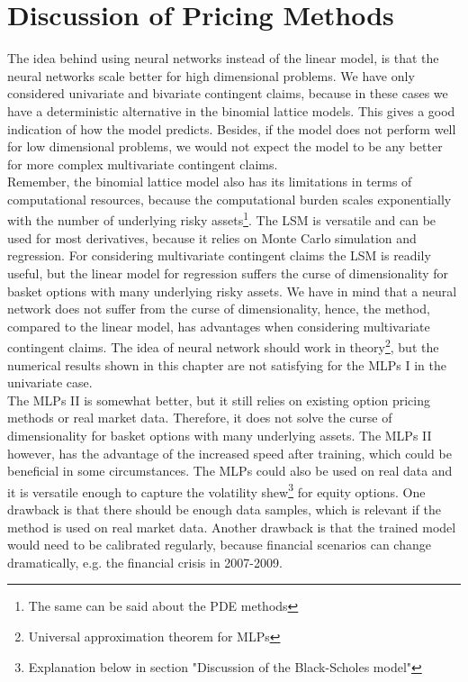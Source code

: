 \section{Discussion of Pricing Methods}
The idea behind using neural networks instead of the linear model, is that the neural networks scale better for high dimensional problems. We have only considered univariate and bivariate contingent claims, because in these cases we have a deterministic alternative in the binomial lattice models. This gives a good indication of how the model predicts. Besides, if the model does not perform well for low dimensional problems, we would not expect the model to be any better for more complex multivariate contingent claims.\\

Remember, the binomial lattice model also has its limitations in terms of computational resources, because the computational burden scales exponentially with the number of underlying risky assets\footnote{The same can be said about the PDE methods}. The LSM is versatile and can be used for most derivatives, because it relies on Monte Carlo simulation and regression. For considering multivariate contingent claims the LSM is readily useful, but the linear model for regression suffers the curse of dimensionality for basket options with many underlying risky assets. We have in mind that a neural network does not suffer from the curse of dimensionality, hence, the method, compared to the linear model, has advantages when considering multivariate contingent claims. The idea of neural network should work in theory\footnote{Universal approximation theorem for MLPs}, but the numerical results shown in this chapter are not satisfying for the MLPs I in the univariate case.\\

The MLPs II is somewhat better, but it still relies on existing option pricing methods or real market data. Therefore, it does not solve the curse of dimensionality for basket options with many underlying assets. The MLPs II however, has the advantage of the increased speed after training, which could be beneficial in some circumstances. The MLPs could also be used on real data and it is versatile enough to capture the volatility shew\footnote{Explanation below in section "Discussion of the Black-Scholes model"} for equity options. One drawback is that there should be enough data samples, which is relevant if the method is used on real market data. Another drawback is that the trained model would need to be calibrated regularly, because financial scenarios can change dramatically, e.g. the financial crisis in 2007-2009.\\

